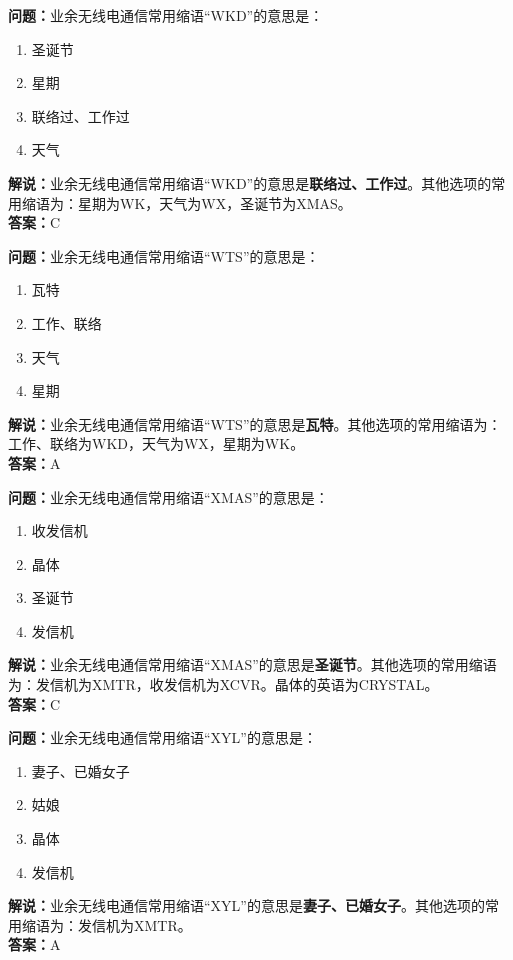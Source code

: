 \bigskip


\noindent\textbf{问题：}业余无线电通信常用缩语“WKD”的意思是：
\begin{enumerate}[label=\Alph*), leftmargin=3em]
\item 圣诞节
\item 星期
\item 联络过、工作过
\item 天气
\end{enumerate}
\noindent\textbf{解说：}业余无线电通信常用缩语“WKD”的意思是\textbf{联络过、工作过}。其他选项的常用缩语为：星期为WK，天气为WX，圣诞节为XMAS。\\\noindent\textbf{答案：}C



\bigskip


\noindent\textbf{问题：}业余无线电通信常用缩语“WTS”的意思是：
\begin{enumerate}[label=\Alph*), leftmargin=3em]
\item 瓦特
\item 工作、联络
\item 天气
\item 星期
\end{enumerate}
\noindent\textbf{解说：}业余无线电通信常用缩语“WTS”的意思是\textbf{瓦特}。其他选项的常用缩语为：工作、联络为WKD，天气为WX，星期为WK。\\\noindent\textbf{答案：}A


\bigskip


\noindent\textbf{问题：}业余无线电通信常用缩语“XMAS”的意思是：
\begin{enumerate}[label=\Alph*), leftmargin=3em]
\item 收发信机
\item 晶体
\item 圣诞节
\item 发信机
\end{enumerate}
\noindent\textbf{解说：}业余无线电通信常用缩语“XMAS”的意思是\textbf{圣诞节}。其他选项的常用缩语为：发信机为XMTR，收发信机为XCVR。晶体的英语为CRYSTAL。\\\noindent\textbf{答案：}C




\bigskip


\noindent\textbf{问题：}业余无线电通信常用缩语“XYL”的意思是：
\begin{enumerate}[label=\Alph*), leftmargin=3em]
\item 妻子、已婚女子
\item 姑娘
\item 晶体
\item 发信机
\end{enumerate}
\noindent\textbf{解说：}业余无线电通信常用缩语“XYL”的意思是\textbf{妻子、已婚女子}。其他选项的常用缩语为：发信机为XMTR。\\\noindent\textbf{答案：}A



